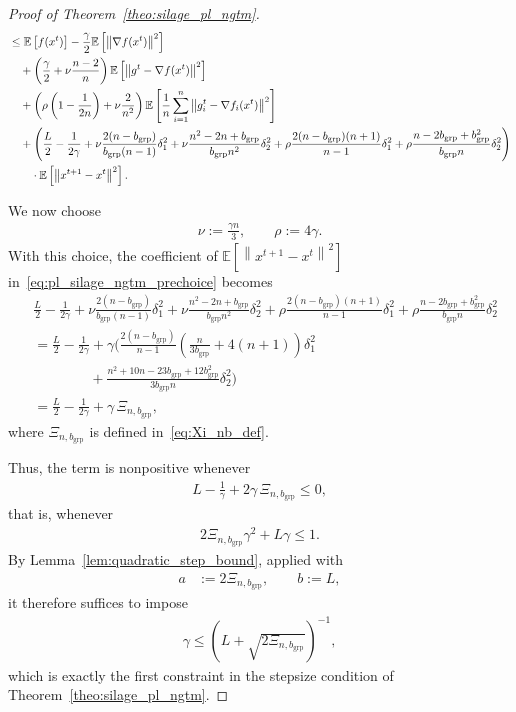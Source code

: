 \documentclass{article}
\newcommand{\bb}{\mathbb}
\newcommand{\sqn}[1]{\left\| #1 \right\|^2}
\newcommand{\eqdef}{:=}
\newcommand{\Exp}[1]{{\bb E}\left[#1\right]}
\theoremstyle{plain}
\begin{document}
\begin{proof}[Proof of Theorem~\ref{theo:silage_pl_ngtm}]
\begin{align}
&\leq \Exp{f(x^t)}
-\frac{\gamma}{2}\Exp{\sqn{\nabla f(x^t)}} \notag\\
&\quad+\left(\frac{\gamma}{2}+\nu\frac{n-2}{n}\right)\Exp{\sqn{g^{t}-\nabla f(x^{t})}}\notag\\
&\quad+\left(\rho\left(1-\frac{1}{2n}\right)+\nu\frac{2}{n^2}\right)
\Exp{\frac{1}{n}\sum_{i=1}^n\sqn{g_i^{t}-\nabla f_i(x^{t})}}\notag\\
&\quad+\Bigg(\frac{L}{2}-\frac{1}{2\gamma}
+\nu\frac{2(n-b_{\mathrm{grp}})}{b_{\mathrm{grp}}(n-1)}\delta_1^2
+\nu\frac{n^2-2n+b_{\mathrm{grp}}}{b_{\mathrm{grp}}n^2}\delta_2^2
+\rho\frac{2(n-b_{\mathrm{grp}})(n+1)}{n-1}\delta_1^2
+\rho\frac{n-2b_{\mathrm{grp}}+b_{\mathrm{grp}}^2}{b_{\mathrm{grp}}n}\delta_2^2\Bigg)\notag\\
&\qquad\cdot\Exp{\sqn{x^{t+1}-x^t}}.
\label{eq:pl_silage_ngtm_prechoice}
\end{align}

We now choose
\begin{align}
\label{eq:nu_rho_choice_ngtm}
\nu \eqdef \frac{\gamma n}{3},
\qquad
\rho \eqdef 4\gamma.
\end{align}
With this choice, the coefficient of $\Exp{\sqn{x^{t+1}-x^t}}$ in~\eqref{eq:pl_silage_ngtm_prechoice} becomes
\begin{align*}
&\frac{L}{2}-\frac{1}{2\gamma}
+\nu\frac{2(n-b_{\mathrm{grp}})}{b_{\mathrm{grp}}(n-1)}\delta_1^2
+\nu\frac{n^2-2n+b_{\mathrm{grp}}}{b_{\mathrm{grp}}n^2}\delta_2^2
+\rho\frac{2(n-b_{\mathrm{grp}})(n+1)}{n-1}\delta_1^2
+\rho\frac{n-2b_{\mathrm{grp}}+b_{\mathrm{grp}}^2}{b_{\mathrm{grp}}n}\delta_2^2\\
&=\frac{L}{2}-\frac{1}{2\gamma}
+\gamma\Bigg(
\frac{2(n-b_{\mathrm{grp}})}{n-1}\left(\frac{n}{3b_{\mathrm{grp}}}+4(n+1)\right)\delta_1^2\\
&\qquad\qquad
+\frac{n^2+10n-23b_{\mathrm{grp}}+12b_{\mathrm{grp}}^2}{3b_{\mathrm{grp}}n}\delta_2^2
\Bigg)\\
&=\frac{L}{2}-\frac{1}{2\gamma}+\gamma\,\Xi_{n,b_{\mathrm{grp}}},
\end{align*}
where $\Xi_{n,b_{\mathrm{grp}}}$ is defined in~\eqref{eq:Xi_nb_def}.

Thus, the term is nonpositive whenever
\begin{align*}
L-\frac{1}{\gamma}+2\gamma\,\Xi_{n,b_{\mathrm{grp}}}\leq 0,
\end{align*}
that is, whenever
\begin{align*}
2\Xi_{n,b_{\mathrm{grp}}}\gamma^2+L\gamma\leq 1.
\end{align*}
By Lemma~\ref{lem:quadratic_step_bound}, applied with
\begin{align*}
a &\eqdef 2\Xi_{n,b_{\mathrm{grp}}},
\qquad
b \eqdef L,
\end{align*}
it therefore suffices to impose
\begin{align*}
\gamma \leq \left(L+\sqrt{2\Xi_{n,b_{\mathrm{grp}}}}\right)^{-1},
\end{align*}
which is exactly the first constraint in the stepsize condition of Theorem~\ref{theo:silage_pl_ngtm}.


\end{proof}
\end{document}
